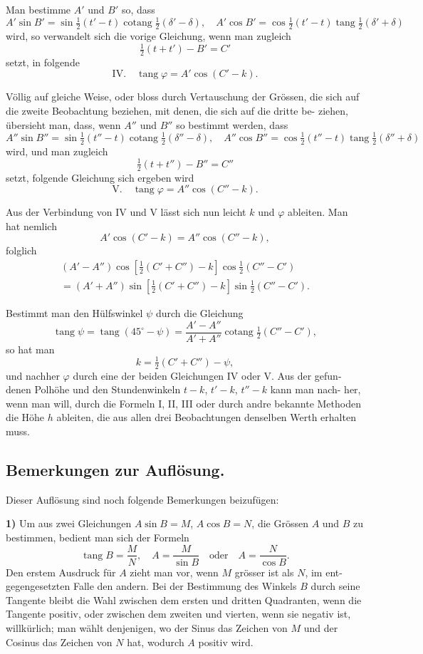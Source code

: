 \documentclass[12pt,a4paper]{article}
\DeclareMathOperator{\tang}{tang}
\DeclareMathOperator{\cotang}{cotang}
\begin{document}
Man bestimme $A'$ und $B'$ so, dass
\[
A'\sin B' = \sin\tfrac{1}{2}(t'-t)\cotang\tfrac{1}{2}(\delta'-\delta),\quad
A'\cos B' = \cos\tfrac{1}{2}(t'-t)\tang\tfrac{1}{2}(\delta'+\delta)
\]
wird, so verwandelt sich die vorige Gleichung, wenn man zugleich
\[
\tfrac{1}{2}(t+t') - B' = C'
\]
setzt, in folgende
\[
\text{IV.}\quad \tang\varphi = A'\cos(C'-k).
\]

Völlig auf gleiche Weise, oder bloss durch Vertauschung der Grössen, die
sich auf die zweite Beobachtung beziehen, mit denen, die sich auf die dritte be-
ziehen, übersieht man, dass, wenn $A''$ und $B''$ so bestimmt werden, dass
\[
A''\sin B'' = \sin\tfrac{1}{2}(t''-t)\cotang\tfrac{1}{2}(\delta''-\delta),\quad
A''\cos B'' = \cos\tfrac{1}{2}(t''-t)\tang\tfrac{1}{2}(\delta''+\delta)
\]
wird, und man zugleich
\[
\tfrac{1}{2}(t+t'') - B'' = C''
\]
setzt, folgende Gleichung sich ergeben wird
\[
\text{V.}\quad \tang\varphi = A''\cos(C''-k).
\]

Aus der Verbindung von IV und V lässt sich nun leicht $k$ und $\varphi$ ableiten.
Man hat nemlich
\[
A'\cos(C'-k) = A''\cos(C''-k),
\]
folglich
\begin{multline*}
(A'-A'')\cos[\tfrac{1}{2}(C'+C'')-k]\cos\tfrac{1}{2}(C''-C')\\
= (A'+A'')\sin[\tfrac{1}{2}(C'+C'')-k]\sin\tfrac{1}{2}(C''-C').
\end{multline*}

Bestimmt man den Hülfswinkel $\psi$ durch die Gleichung
\[
\tang\psi = \tang(45^{\circ} - \psi) = \frac{A'-A''}{A'+A''}\cotang\tfrac{1}{2}(C''-C'),
\]
so hat man
\[
k = \tfrac{1}{2}(C'+C'') - \psi,
\]
und nachher $\varphi$ durch eine der beiden Gleichungen IV oder V.
Aus der gefun-
denen Polhöhe und den Stundenwinkeln $t-k$, $t'-k$, $t''-k$ kann man nach-
her, wenn man will, durch die Formeln I, II, III oder durch andre bekannte
Methoden die Höhe $h$ ableiten, die aus allen drei Beobachtungen denselben
Werth erhalten muss.

\subsection{Bemerkungen zur Auflösung.}

Dieser Auflösung sind noch folgende Bemerkungen beizufügen:

\textbf{1)} Um aus zwei Gleichungen $A\sin B = M$, $A\cos B = N$, die Grössen
$A$ und $B$ zu bestimmen, bedient man sich der Formeln
\[
\tang B = \frac{M}{N},\quad A = \frac{M}{\sin B} \quad \text{oder} \quad A = \frac{N}{\cos B}.
\]
Den erstem Ausdruck für $A$ zieht man vor, wenn $M$ grösser ist als $N$, im ent-
gegengesetzten Falle den andern. Bei der Bestimmung des Winkels $B$ durch
seine Tangente bleibt die Wahl zwischen dem ersten und dritten Quadranten, wenn
die Tangente positiv, oder zwischen dem zweiten und vierten, wenn sie negativ
ist, willkürlich; man wählt denjenigen, wo der Sinus das Zeichen von $M$ und
der Cosinus das Zeichen von $N$ hat, wodurch $A$ positiv wird.
\end{document}
